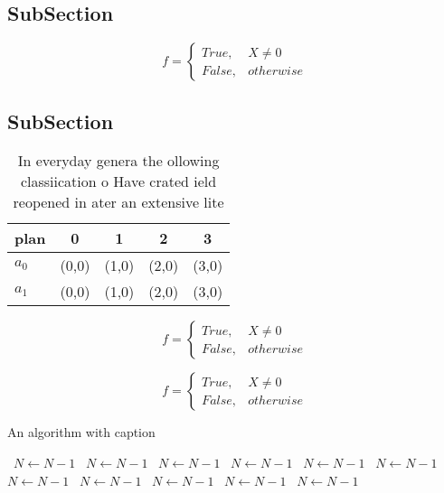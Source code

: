 \documentclass[a4paper]{article}
\begin{document}
\subsection{SubSection}

\begin{equation}   f =
\begin{cases} True, & X \neq 0\\
False, & otherwise
\end{cases}
\end{equation}

\subsection{SubSection}

\begin{table}
\begin{adjustbox}{width=0.5\columnwidth}
\begin{tabular}{|l|l|l|l|l|}
\hline
\textbf{plan} & \multicolumn{1}{c|}{\textbf{0}} & \multicolumn{1}{c|}{\textbf{1}} & \multicolumn{1}{c|}{\textbf{2}} & \multicolumn{1}{c|}{\textbf{3}} \\ \hline
\textbf{$a_0$}  & (0,0) & (1,0) & (2,0) & (3,0) \\ \hline
\textbf{$a_1$}  & (0,0) & (1,0) & (2,0) & (3,0) \\ \hline
\end{tabular}
\end{adjustbox}
\caption{In everyday genera the ollowing classiication o Have crated ield reopened in ater an extensive lite
}
\end{table}

\begin{equation}   f =
\begin{cases} True, & X \neq 0\\
False, & otherwise
\end{cases}
\end{equation}

\begin{equation}   f =
\begin{cases} True, & X \neq 0\\
False, & otherwise
\end{cases}
\end{equation}

\begin{algorithm}
\caption{An algorithm with caption}
\begin{algorithmic}
\    \State $N \gets N - 1$
\    \State $N \gets N - 1$
\    \State $N \gets N - 1$
\    \State $N \gets N - 1$
\    \State $N \gets N - 1$
\    \State $N \gets N - 1$
\    \State $N \gets N - 1$
\    \State $N \gets N - 1$
\    \State $N \gets N - 1$
\    \State $N \gets N - 1$
\    \State $N \gets N - 1$
\EndWhile
\end{algorithmic}
\end{algorithm}
\end{document}
